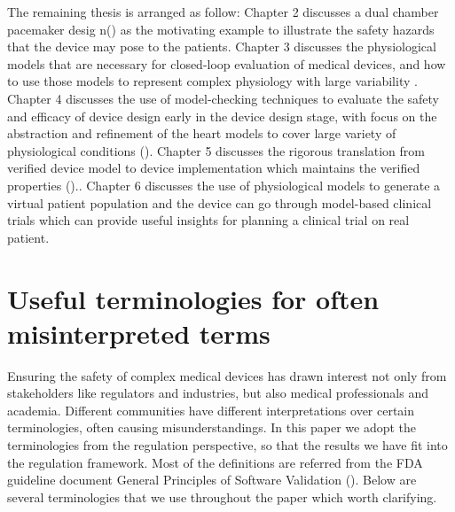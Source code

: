 The remaining thesis is arranged as follow:
Chapter 2 discusses a dual chamber pacemaker desig n(\cite{compass}) as the motivating example to illustrate the safety hazards that the device may pose to the patients.
Chapter 3 discusses the physiological models that are necessary for closed-loop evaluation of medical devices, and how to use those models to represent complex physiology with large variability \cite{VHM_proc}.
Chapter 4 discusses the use of model-checking techniques to evaluate the safety and efficacy of device design early in the device design stage, with focus on the abstraction and refinement of the heart models to cover large variety of physiological conditions (\cite{STTT13}).
Chapter 5 discusses the rigorous translation from verified device model to device implementation which maintains the verified properties (\cite{RTAS12})..
Chapter 6 discusses the use of physiological models to generate a virtual patient population and the device can go through model-based clinical trials which can provide useful insights for planning a clinical trial on real patient.


\section{Useful terminologies for often misinterpreted terms}
Ensuring the safety of complex medical devices has drawn interest not only from stakeholders like regulators and industries, but also medical professionals and academia. Different communities have different interpretations over certain terminologies, often causing misunderstandings. In this paper we adopt the terminologies from the regulation perspective, so that the results we have fit into the regulation framework. Most of the definitions are referred from the FDA guideline document General Principles of Software Validation (\cite{fda2}). Below are several terminologies that we use throughout the paper which worth clarifying.
